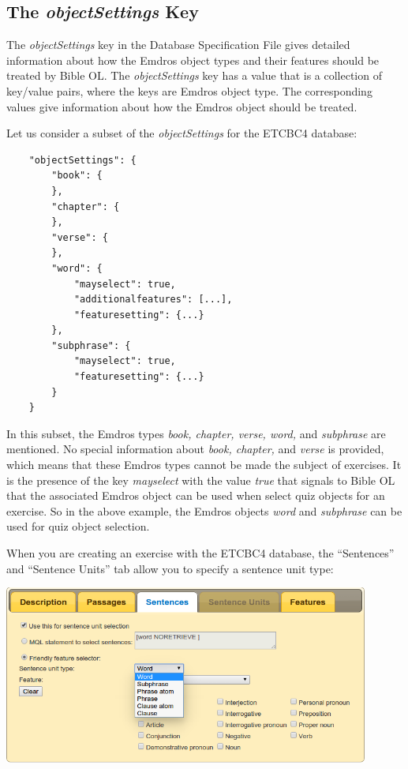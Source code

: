 \documentclass[11pt,oneside,a4paper]{memoir}
\begin{document}
\subsection{The \emph{objectSettings} Key}\label{sec-objectsettings}

The \emph{objectSettings} key in the Database Specification File gives detailed information about
how the Emdros object types and their features should be treated by Bible OL. The
\emph{objectSettings} key has a value that is a collection of key/value pairs, where the keys are
Emdros object type. The corresponding values give information about how the Emdros object should be
treated.

Let us consider a subset of the \emph{objectSettings} for the ETCBC4 database:

\begin{lstlisting}
    "objectSettings": {
        "book": {
        },
        "chapter": {
        },
        "verse": {
        },
        "word": {
            "mayselect": true,
            "additionalfeatures": [...],
            "featuresetting": {...}
        },
        "subphrase": {
            "mayselect": true,
            "featuresetting": {...}
        }
    }
\end{lstlisting}

In this subset, the Emdros types \emph{book, chapter, verse, word,} and \emph{subphrase} are
mentioned. No special information about \emph{book, chapter,} and \emph{verse} is provided, which
means that these Emdros types cannot be made the subject of exercises. It is the presence of the
key \emph{mayselect} with the value \emph{true} that signals to Bible OL that the associated Emdros
object can be used when select quiz objects for an exercise. So in the above example, the Emdros
objects \emph{word} and \emph{subphrase} can be used for quiz object selection.

When you are creating an exercise with the ETCBC4 database, the ``Sentences'' and ``Sentence Units''
tab allow you to specify a sentence unit type:

\begin{center}
  \includegraphics[width=0.9\textwidth]{senselect.png}
\end{center}
\end{document}
